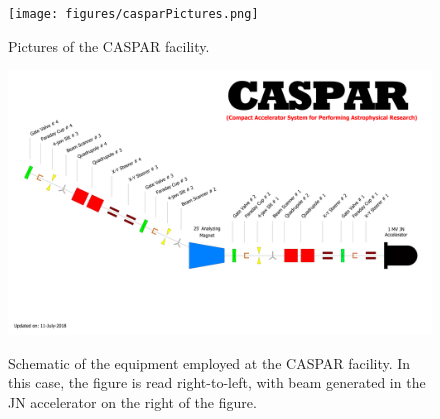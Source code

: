 \begin{figure}
\centering
\texttt{[image: figures/casparPictures.png]}
\label{fig: casparPictures}
\caption{Pictures of the CASPAR facility. }
\end{figure}



\begin{figure}
\centering
\includegraphics[width=\linewidth]{figures/casparSchematic.pdf}
\label{fig: casparSchematic}
\caption{Schematic of the equipment employed at the CASPAR facility. In this case, the figure is read right-to-left, with beam generated in the JN accelerator on the right of the figure. }
\end{figure}



